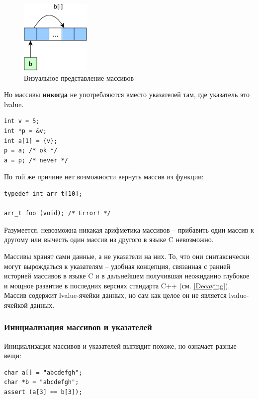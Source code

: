 \documentclass[a4paper,12pt,oneside]{article}
\begin{document}
\begin{figure}[h!]
\centering
\includegraphics[width=0.3\textwidth]{illustrations/arrays-crop.pdf}
\caption{Визуальное представление массивов}
\label{fig:arrays-crop}
\end{figure}

Но массивы \textbf{никогда} не употребляются вместо указателей там, где указатель это lvalue.

\begin{lstlisting}
int v = 5;
int *p = &v;
int a[1] = {v};
p = a; /* ok */
a = p; /* never */
\end{lstlisting}

По той же причине нет возможности вернуть массив из функции:

\begin{lstlisting}
typedef int arr_t[10];

arr_t foo (void); /* Error! */
\end{lstlisting}

Разумеется, невозможна никакая арифметика массивов -- прибавить один массив к другому или вычесть один массив из другого в языке C невозможно.

Массивы хранят сами данные, а не указатели на них. То, что они синтаксически могут вырождаться к указателям -- удобная концепция, связанная с ранней историей массивов в языке C и в дальнейшем получившая неожиданно глубокое и мощное развитие в последних версиях стандарта C++ (см. \ref{Decaying}). Массив содержит lvalue-ячейки данных, но сам как целое он не является lvalue-ячейкой данных.

\subsubsection{Инициализация массивов и указателей}

Инициализация массивов и указателей выглядит похоже, но означает разные вещи:

\begin{lstlisting}
char a[] = "abcdefgh";
char *b = "abcdefgh";
assert (a[3] == b[3]);
\end{lstlisting}
\end{document}
